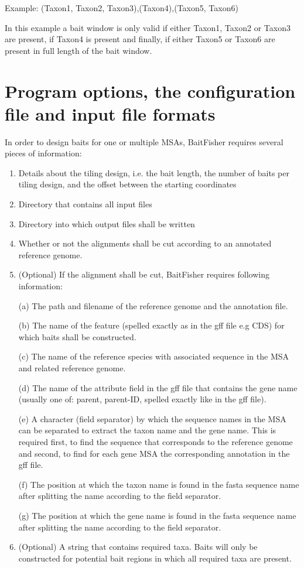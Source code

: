\documentclass[a4paper,pdflatex,11pt]{article}
\begin{document}
Example: (Taxon1, Taxon2, Taxon3),(Taxon4),(Taxon5, Taxon6)

In this example a bait window is only valid if either Taxon1, Taxon2 or
Taxon3 are present, if Taxon4 is present and finally, if either Taxon5 or Taxon6 are present in full length of the bait window.


\section{Program options, the configuration file and input file formats}

In order to design baits for one or multiple MSAs, BaitFisher requires
several pieces of information:

\begin{enumerate}
\def\labelenumi{\roman{enumi}.}
\item
  Details about the tiling design, i.e. the bait length, the number of
  baits per tiling design, and the offset between the starting
  coordinates
\item
  Directory that contains all input files
\item
  Directory into which output files shall be written
\item
   Whether or not the alignments shall be cut according to an
  annotated reference genome.
\item
  (Optional) If the alignment shall be cut, BaitFisher requires
  following information:


(a) The path and filename of the reference genome and the annotation
file.

(b) The name of the feature (spelled exactly as in the gff file e.g CDS)
for which baits shall be constructed.

(c) The name of the reference species with associated sequence in the
MSA and related reference genome.

(d) The name of the attribute field in the gff file that contains the
gene name (usually one of: parent, parent-ID, spelled exactly like in
the gff file).

(e) A character (field separator) by which the sequence names in the MSA
can be separated to extract the taxon name and the gene name. This is
required first, to find the sequence that corresponds to the reference
genome and second, to find for each gene MSA the corresponding
annotation in the gff file.

(f) The position at which the taxon name is found in the fasta sequence
name after splitting the name according to the field separator.

(g) The position at which the gene name is found in the fasta sequence
name after splitting the name according to the field separator.

  \item (Optional) A string that contains required taxa. Baits will only be
  constructed for potential bait regions in which all required taxa are
  present.

\end{enumerate}
\end{document}
